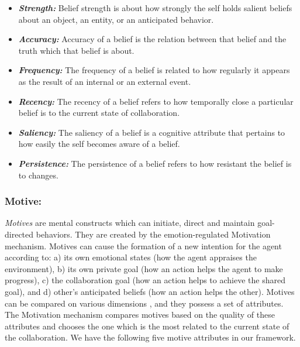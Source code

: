\documentclass[letterpaper]{article}
\begin{document}
\begin{itemize}
  \item \textbf{\textit{Strength:}} Belief strength is about how strongly the
  self holds salient beliefs about an object, an entity, or an anticipated
  behavior.
  
  \item \textbf{\textit{Accuracy:}} Accuracy of a belief is the relation between
  that belief and the truth which that belief is about.
  
  \item \textbf{\textit{Frequency:}} The frequency of a belief is related to how
  regularly it appears as the result of an internal or an external event.
  
  \item \textbf{\textit{Recency:}} The recency of a belief refers to how
  temporally close a particular belief is to the current state of collaboration.
  
  \item \textbf{\textit{Saliency:}} The saliency of a belief is a cognitive
  attribute that pertains to how easily the self becomes aware of a belief.
  
  \item \textbf{\textit{Persistence:}} The persistence of a belief refers to how
  resistant the belief is to changes.
\end{itemize}

\subsubsection{Motive:}

\textit{Motives} are mental constructs which can initiate, direct and maintain
goal-directed behaviors. They are created by the emotion-regulated Motivation
mechanism. Motives can cause the formation of a new intention for the agent
according to: a) its own emotional states (how the agent appraises the
environment), b) its own private goal (how an action helps the agent to make
progress), c) the collaboration goal (how an action helps to achieve the shared
goal), and d) other's anticipated beliefs (how an action helps the other).
Motives can be compared on various dimensions \cite{sloman:motivation}, and
they possess a set of attributes. The Motivation mechanism compares motives
based on the quality of these attributes and chooses the one which is the most
related to the current state of the collaboration. We have the following five
motive attributes in our framework.
\end{document}
